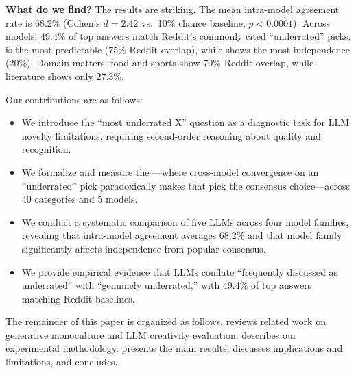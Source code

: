 {\bf What do we find?} The results are striking. The mean intra-model agreement rate is 68.2\% (Cohen's $d = 2.42$ vs.\ 10\% chance baseline, $p < 0.0001$). Across models, 49.4\% of top answers match Reddit's commonly cited ``underrated'' picks. \gptfour is the most predictable (75\% Reddit overlap), while \llama shows the most independence (20\%). Domain matters: food and sports show 70\% Reddit overlap, while literature shows only 27.3\%.

Our contributions are as follows:
\begin{itemize}[leftmargin=*,itemsep=0pt,topsep=0pt]
    \item We introduce the ``most underrated X'' question as a diagnostic task for LLM novelty limitations, requiring second-order reasoning about quality and recognition.
    \item We formalize and measure the \noveltyparadox---where cross-model convergence on an ``underrated'' pick paradoxically makes that pick the consensus choice---across 40 categories and 5 models.
    \item We conduct a systematic comparison of five LLMs across four model families, revealing that intra-model agreement averages 68.2\% and that model family significantly affects independence from popular consensus.
    \item We provide empirical evidence that LLMs conflate ``frequently discussed as underrated'' with ``genuinely underrated,'' with 49.4\% of top answers matching Reddit baselines.
\end{itemize}

The remainder of this paper is organized as follows.  reviews related work on generative monoculture and LLM creativity evaluation.  describes our experimental methodology.  presents the main results.  discusses implications and limitations, and  concludes.
